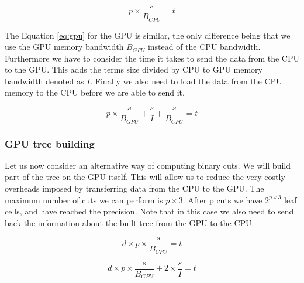 \documentclass[]{article}
\begin{document}
\begin{center}
	\begin{equation}
			p \times \frac{ s }{B_{CPU}} = t
			\label{eq:cpu}
	\end{equation}
\end{center}

\vspace{5mm}


The Equation \ref{eq:gpu} for the GPU is similar, the only difference being that we use the GPU memory bandwidth $B_{GPU}$ instead of the CPU bandwidth. Furthermore we have to consider the time it takes to send the data from the CPU to the GPU. This adds the terms size divided by CPU to GPU memory bandwidth denoted as $I$. Finally we also need to load the data from the CPU memory to the CPU before we are able to send it. 

\begin{center}
	\begin{equation}
		p \times \frac{s}{B_{GPU}} + \frac{s}{I}  + \frac{s}{B_{CPU}}= t
		\label{eq:gpu}
	\end{equation}
\end{center}

\vspace{5mm}


\subsubsection{GPU tree building}

Let us now consider an alternative way of computing binary cuts. We will build part of the tree on the GPU itself. This will allow us to reduce the very costly overheads imposed by transferring data from the CPU to the GPU. The maximum number of cuts we can perform is $p \times 3$. After p cuts we have $2^{p \times 3}$ leaf cells, and have reached the precision. Note that in this case we also need to send back the information about the built tree from the GPU to the CPU. 

\begin{center}
	\begin{equation}
		d \times p \times \frac{s}{B_{CPU}} = t
		\label{eq:cputree}
	\end{equation}
\end{center}

\begin{center}
	\begin{equation}
		d \times p \times \frac{s}{B_{GPU}} + 2 \times \frac{s}{I} = t
		\label{eq:gputree}
	\end{equation}
\end{center}
\end{document}
